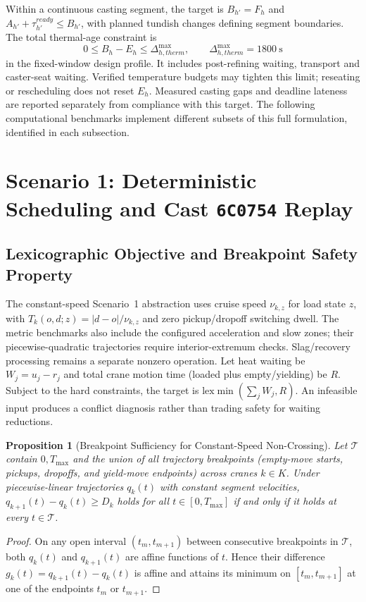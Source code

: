 \documentclass[11pt,a4paper]{article}
\newtheorem{proposition}{Proposition}
\begin{document}
Within a continuous casting segment, the target is $B_{h'}=F_h$ and $A_{h'}+\tau_{h'}^{ready}\le B_{h'}$, with planned tundish changes defining segment boundaries. The total thermal-age constraint is
\begin{equation}
  0\le B_h-E_h\le\Delta_{h,therm}^{\max},\qquad \Delta_{h,therm}^{\max}=1800\ \text{s}
\end{equation}
in the fixed-window design profile. It includes post-refining waiting, transport and caster-seat waiting. Verified temperature budgets may tighten this limit; reseating or rescheduling does not reset $E_h$. Measured casting gaps and deadline lateness are reported separately from compliance with this target. The following computational benchmarks implement different subsets of this full formulation, identified in each subsection.

\section{Scenario 1: Deterministic Scheduling and Cast \texttt{6C0754} Replay}

\subsection{Lexicographic Objective and Breakpoint Safety Property}
The constant-speed Scenario~1 abstraction uses cruise speed $\nu_{k,z}$ for load state $z$, with $T_k(o,d;z)=|d-o|/\nu_{k,z}$ and zero pickup/dropoff switching dwell. The metric benchmarks also include the configured acceleration and slow zones; their piecewise-quadratic trajectories require interior-extremum checks. Slag/recovery processing remains a separate nonzero operation. Let heat waiting be $W_j = u_j - r_j$ and total crane motion time (loaded plus empty/yielding) be $R$. Subject to the hard constraints, the target is $\text{lex}\min(\sum_j W_j,R)$. An infeasible input produces a conflict diagnosis rather than trading safety for waiting reductions.

\begin{proposition}[Breakpoint Sufficiency for Constant-Speed Non-Crossing]
Let $\mathcal{T}$ contain $0,T_{\max}$ and the union of all trajectory breakpoints (empty-move starts, pickups, dropoffs, and yield-move endpoints) across cranes $k \in K$. Under piecewise-linear trajectories $q_k(t)$ with constant segment velocities, $q_{k+1}(t) - q_k(t) \ge D_k$ holds for all $t \in [0, T_{\max}]$ if and only if it holds at every $t \in \mathcal{T}$.
\end{proposition}
\begin{proof}
On any open interval $(t_m, t_{m+1})$ between consecutive breakpoints in $\mathcal{T}$, both $q_k(t)$ and $q_{k+1}(t)$ are affine functions of $t$. Hence their difference $g_k(t) = q_{k+1}(t) - q_k(t)$ is affine and attains its minimum on $[t_m, t_{m+1}]$ at one of the endpoints $t_m$ or $t_{m+1}$.
\end{proof}
\end{document}
